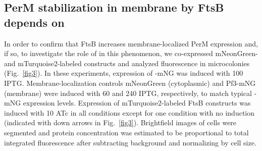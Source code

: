 \documentclass[pdflatex,sn-basic]{sn-jnl}%
\begin{document}
\subsection{PerM stabilization in \ec{} membrane by FtsB depends on \ftsbH{}}

In order to confirm that FtsB increases membrane-localized PerM expression and, if so, to investigate the role of \ftsbH{} in this phenomenon, we co-expressed mNeonGreen- and mTurquoise2-labeled constructs and analyzed fluorescence in \ec{} microcolonies (Fig.~\ref{fig3}). In these experiments, expression of \permN{}-mNG was induced with \qty{100}{\uM} IPTG. Membrane-localization controls mNeonGreen (cytoplasmic) and Pf3-mNG (membrane) were induced with \qty{60}{\uM} and \qty{240}{\uM} IPTG, respectively, to match typical \permN{}-mNG expression levels. Expression of mTurquoise2-labeled FtsB constructs was induced with \qty{10}{\nM} ATc in all conditions except for one condition with no induction (indicated with down arrows in Fig.~\ref{fig3}). Brightfield images of \ec{} cells were segmented and protein concentration was estimated to be proportional to total integrated fluorescence after subtracting background and normalizing by cell size.
\end{document}
